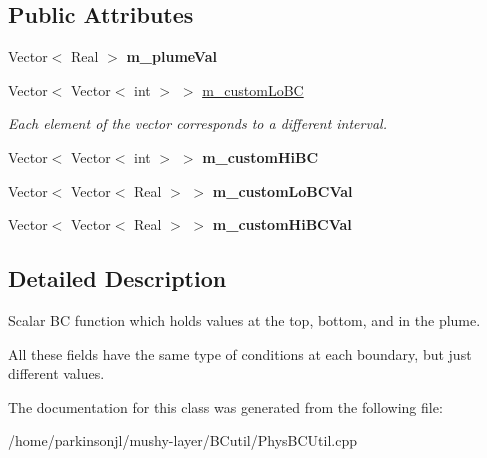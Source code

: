 \subsection*{Public Attributes}
\begin{DoxyCompactItemize}
\item 
\hypertarget{class_advect_diffuse_scalar_b_c_a24079c63607fa7aaada70d393c91038e}{Vector$<$ Real $>$ {\bfseries m\-\_\-plume\-Val}}\label{class_advect_diffuse_scalar_b_c_a24079c63607fa7aaada70d393c91038e}

\item 
\hypertarget{class_advect_diffuse_scalar_b_c_a88722dbb4d1fde30f3608db8104640c0}{Vector$<$ Vector$<$ int $>$ $>$ \hyperlink{class_advect_diffuse_scalar_b_c_a88722dbb4d1fde30f3608db8104640c0}{m\-\_\-custom\-Lo\-B\-C}}\label{class_advect_diffuse_scalar_b_c_a88722dbb4d1fde30f3608db8104640c0}

\begin{DoxyCompactList}\small\item\em Each element of the vector corresponds to a different interval. \end{DoxyCompactList}\item 
\hypertarget{class_advect_diffuse_scalar_b_c_a3143ed8cc319ce90e64e936c459f9b12}{Vector$<$ Vector$<$ int $>$ $>$ {\bfseries m\-\_\-custom\-Hi\-B\-C}}\label{class_advect_diffuse_scalar_b_c_a3143ed8cc319ce90e64e936c459f9b12}

\item 
\hypertarget{class_advect_diffuse_scalar_b_c_ab09adbfb8bbf7bd9ec9d51f2d0b1106a}{Vector$<$ Vector$<$ Real $>$ $>$ {\bfseries m\-\_\-custom\-Lo\-B\-C\-Val}}\label{class_advect_diffuse_scalar_b_c_ab09adbfb8bbf7bd9ec9d51f2d0b1106a}

\item 
\hypertarget{class_advect_diffuse_scalar_b_c_a5733082dd61f2021d755cfebda84481d}{Vector$<$ Vector$<$ Real $>$ $>$ {\bfseries m\-\_\-custom\-Hi\-B\-C\-Val}}\label{class_advect_diffuse_scalar_b_c_a5733082dd61f2021d755cfebda84481d}

\end{DoxyCompactItemize}


\subsection{Detailed Description}
Scalar B\-C function which holds values at the top, bottom, and in the plume. 

All these fields have the same type of conditions at each boundary, but just different values. 

The documentation for this class was generated from the following file\-:\begin{DoxyCompactItemize}
\item 
/home/parkinsonjl/mushy-\/layer/\-B\-Cutil/Phys\-B\-C\-Util.\-cpp\end{DoxyCompactItemize}
